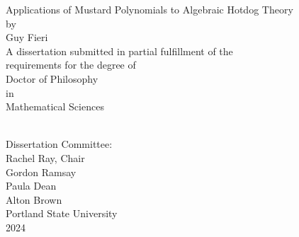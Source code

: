 \def\AUTHOR{Guy Fieri}

\def\TITLE{
    Applications of Mustard Polynomials to Algebraic Hotdog Theory
}

\def\DEGREE{
    Doctor of Philosophy\\
    in\\
    Mathematical Sciences
}

\def\COMMITTEE{
    Rachel Ray, Chair\\
    Gordon Ramsay\\
    Paula Dean\\
    Alton Brown
}

\def\INSTITUTION{Portland State University}

\def\YEAR{2024}

\begin{center}
    \TITLE\\[1.0in]
    by\\[12pt]
    \AUTHOR
    \\[1.0in]
    A dissertation submitted in partial fulfillment of the \\
    requirements for the degree of
    \\[1.0in]
    \DEGREE
    \\[1.0in]
    Dissertation Committee:\\
    \COMMITTEE\\[1.0in]
    \INSTITUTION\\
    \YEAR
\end{center}